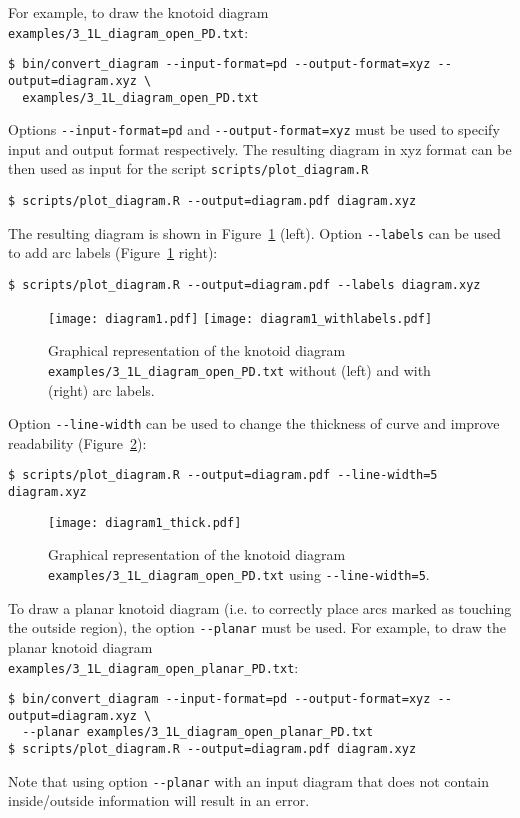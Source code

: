 For example, to draw the knotoid diagram \lstinline{examples/3_1L_diagram_open_PD.txt}:
\begin{lstlisting}
$ bin/convert_diagram --input-format=pd --output-format=xyz --output=diagram.xyz \
  examples/3_1L_diagram_open_PD.txt
\end{lstlisting}
Options \lstinline{--input-format=pd} and \lstinline{--output-format=xyz} must be used to specify input and output format respectively. The resulting diagram in xyz format can be then used as input for the  script \lstinline{scripts/plot_diagram.R}
\begin{lstlisting}
$ scripts/plot_diagram.R --output=diagram.pdf diagram.xyz
\end{lstlisting}
The resulting diagram is shown in Figure~\ref{fig:diagram1} (left). Option \lstinline{--labels} can be used to add arc labels (Figure~\ref{fig:diagram1} right):
\begin{lstlisting}
$ scripts/plot_diagram.R --output=diagram.pdf --labels diagram.xyz
\end{lstlisting}
\begin{figure}[t]
\centering
\texttt{[image: diagram1.pdf]}
\texttt{[image: diagram1\_withlabels.pdf]}
\caption{Graphical representation of the knotoid diagram \lstinline{examples/3_1L_diagram_open_PD.txt} without (left) and with (right) arc labels.}\label{fig:diagram1}
\end{figure}
Option \lstinline{--line-width} can be used to change the thickness of curve and improve readability (Figure~\ref{fig:diagram1thick}):
\begin{lstlisting}
$ scripts/plot_diagram.R --output=diagram.pdf --line-width=5 diagram.xyz
\end{lstlisting}
\begin{figure}[t]
\centering
\texttt{[image: diagram1\_thick.pdf]}
\caption{Graphical representation of the knotoid diagram \lstinline{examples/3_1L_diagram_open_PD.txt} using \lstinline{--line-width=5}.}\label{fig:diagram1thick}
\end{figure}

To draw a planar knotoid diagram (i.e. to correctly place arcs marked as touching the outside region), the option \lstinline{--planar} must be used. For example, to draw the planar knotoid diagram\\
\lstinline{examples/3_1L_diagram_open_planar_PD.txt}:
\begin{lstlisting}
$ bin/convert_diagram --input-format=pd --output-format=xyz --output=diagram.xyz \
  --planar examples/3_1L_diagram_open_planar_PD.txt
$ scripts/plot_diagram.R --output=diagram.pdf diagram.xyz
\end{lstlisting}
Note that using option \lstinline{--planar} with an input diagram that does not contain inside/outside information will result in an error.

